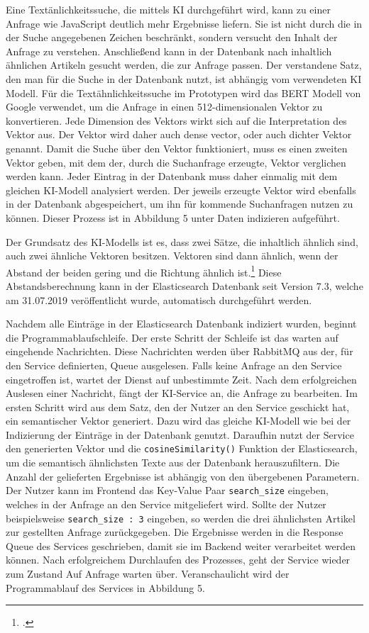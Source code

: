Eine Textänlichkeitssuche, die mittels KI durchgeführt wird, kann zu einer Anfrage wie \glqq JavaScript\grqq{} deutlich mehr Ergebnisse liefern. Sie ist nicht durch die in der Suche  angegebenen Zeichen beschränkt, sondern versucht den Inhalt der Anfrage zu verstehen. Anschließend kann in der Datenbank nach inhaltlich ähnlichen Artikeln gesucht werden, die zur Anfrage passen. Der \glqq verstandene\grqq{} Satz, den man für die Suche in der Datenbank nutzt, ist abhängig vom verwendeten KI Modell. Für die Textähnlichkeitssuche im Prototypen wird das BERT Modell von Google verwendet, um die Anfrage in einen 512-dimensionalen Vektor zu konvertieren. Jede Dimension des Vektors wirkt sich auf die Interpretation des Vektor aus. Der Vektor wird daher auch \glqq dense vector\grqq{}, oder auch dichter Vektor genannt. Damit die Suche über den Vektor funktioniert, muss es einen zweiten Vektor geben, mit dem der, durch die Suchanfrage erzeugte, Vektor verglichen werden kann. Jeder Eintrag in der Datenbank muss daher einmalig mit dem gleichen KI-Modell analysiert werden. Der jeweils erzeugte Vektor wird ebenfalls in der Datenbank abgespeichert, um ihn für kommende Suchanfragen nutzen zu können. Dieser Prozess ist in Abbildung 5 unter \glqq Daten indizieren\grqq{} aufgeführt.

Der Grundsatz des KI-Modells ist es, dass zwei Sätze, die inhaltlich ähnlich sind, auch zwei ähnliche Vektoren besitzen. Vektoren sind dann ähnlich, wenn der Abstand der beiden gering und die Richtung ähnlich ist.\footcite{rahutomo2012semantic} Diese Abstandsberechnung kann in der Elasticsearch Datenbank seit Version 7.3, welche am 31.07.2019 veröffentlicht wurde, automatisch durchgeführt werden. 

Nachdem alle Einträge in der Elasticsearch Datenbank indiziert wurden, beginnt die Programmablaufschleife. Der erste Schritt der Schleife ist das warten auf eingehende Nachrichten. Diese Nachrichten werden über RabbitMQ aus der, für den Service definierten, Queue ausgelesen. Falls keine Anfrage an den Service eingetroffen ist, wartet der Dienst auf unbestimmte Zeit. Nach dem erfolgreichen Auslesen einer Nachricht, fängt der KI-Service an, die Anfrage zu bearbeiten. Im ersten Schritt wird aus dem Satz, den der Nutzer an den Service geschickt hat, ein semantischer Vektor generiert. Dazu wird das gleiche KI-Modell wie bei der Indizierung der Einträge in der Datenbank genutzt. Daraufhin nutzt der Service den generierten Vektor und die \texttt{cosineSimilarity()} Funktion der Elasticsearch, um die semantisch ähnlichsten Texte aus der Datenbank herauszufiltern. Die Anzahl der gelieferten Ergebnisse ist abhängig von den übergebenen Parametern. Der Nutzer kann im Frontend das Key-Value Paar \texttt{search\_{}size} eingeben, welches in der Anfrage an den Service mitgeliefert wird. Sollte der Nutzer beispielsweise \texttt{\glqq search\_{}size : 3\grqq{}} eingeben, so werden die drei ähnlichsten Artikel zur gestellten Anfrage zurückgegeben. Die Ergebnisse werden in die Response Queue des Services geschrieben, damit sie im Backend weiter verarbeitet werden können. Nach erfolgreichem Durchlaufen des Prozesses, geht der Service wieder zum Zustand \glqq Auf Anfrage warten\grqq{} über. Veranschaulicht wird der Programmablauf des Services in Abbildung 5.

